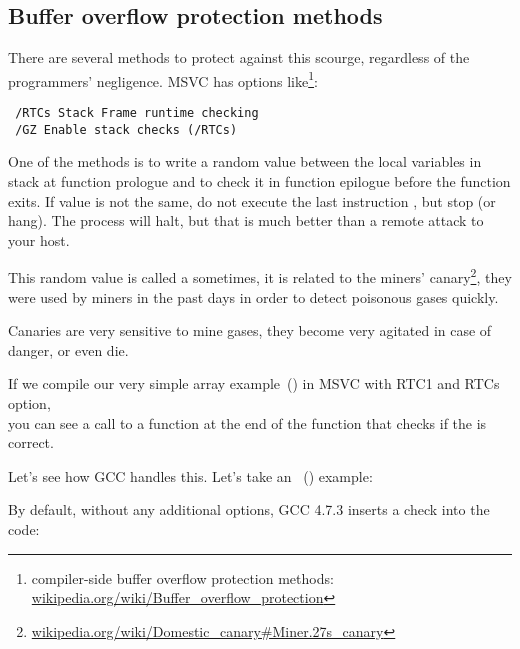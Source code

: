 \subsection{Buffer overflow protection methods}
\label{subsec:BO_protection}

There are several methods to protect against this scourge, regardless of the \CCpp programmers' negligence.
MSVC has options like\footnote{compiler-side buffer overflow protection methods:
\href{http://go.yurichev.com/17133}{wikipedia.org/wiki/Buffer\_overflow\_protection}}:

\begin{lstlisting}
 /RTCs Stack Frame runtime checking
 /GZ Enable stack checks (/RTCs)
\end{lstlisting}


One of the methods is to write a random value between the local variables in stack at function prologue 
and to check it in function epilogue before the function exits.
If value is not the same, do not execute the last instruction \RET, but stop (or hang).
The process will halt, but that is much better than a remote attack to your host.
    
\newcommand{\CANARYURL}{\href{http://go.yurichev.com/17134}{wikipedia.org/wiki/Domestic\_canary\#Miner.27s\_canary}}


This random value is called a  sometimes, it is related to the miners' canary\footnote{\CANARYURL},
they were used by miners in the past days in order to detect poisonous gases quickly.

Canaries are very sensitive to mine gases, they become very agitated in case of danger, or even die.

If we compile our very simple array example~() in \ac{MSVC}
with RTC1 and RTCs option,\\
you can see a call to  a function at the end of the function that checks if the  is correct.

Let's see how GCC handles this. 
Let's take an ~() example:



By default, without any additional options, GCC 4.7.3 inserts a  check into the code:

